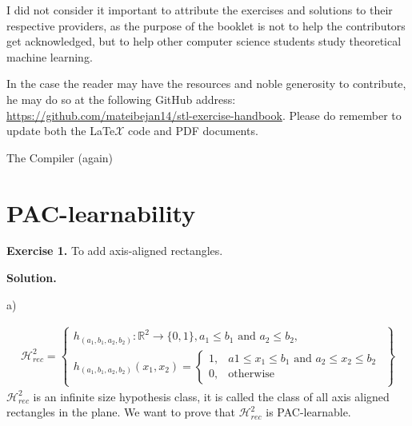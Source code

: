 \documentclass{article}
\newcommand{\<}{\langle}
\renewcommand{\>}{\rangle}
\theoremstyle{definition}
\def\gH{{\mathcal{H}}}
\def\sR{{\mathbb{R}}}
\newcommand{\hrs}{\gH_{rec}^2}
\newcommand{\sRs}{\sR^2}
\newcommand{\hrs}{\gH_{rec}^2}
\newcommand{\sRs}{\sR^2}
\begin{document}
I did not consider it important to attribute the exercises and solutions to their respective providers, as the purpose of the booklet is not to help the contributors get acknowledged, but to help other computer science students study theoretical machine learning.

In the case the reader may have the resources and noble generosity to contribute, he may do so at the following GitHub address: \url{https://github.com/mateibejan14/stl-exercise-handbook}. Please do remember to update both the LaTe$\mathcal{X}$ code and PDF documents.

\hspace{8cm} The Compiler (again)

\newpage

\tableofcontents

\newpage

\section{PAC-learnability}

\textbf{Exercise 1.} To add axis-aligned rectangles.

\textbf{Solution.}


a)

\begin{align*}
\hrs = \left\{
  \begin{array}{ll}
   h_{(a_1, b_1, a_2, b_2)} \colon \sRs \rightarrow \{0, 1\},
     a_1 \leq b_1 \text{ and } a_2 \leq b_2, \\
   h_{(a_1, b_1, a_2, b_2)}(x_1, x_2) = 
     \begin{cases}
       1, & a1 \leq x_1 \leq b_1 \text{ and } a_2 \leq x_2 \leq b_2 \\
       0, &\text{otherwise}
     \end{cases}
  \end{array}
        \right\}
\end{align*}
$\hrs$ is an infinite size hypothesis class, it is called the class of all axis aligned
rectangles in the plane. We want to prove that $\hrs$ is PAC-learnable.
\end{document}
